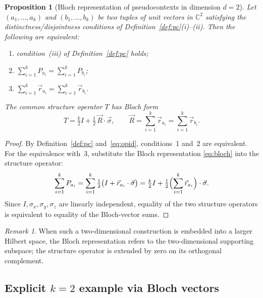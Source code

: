 \documentclass[
  twocolumn,
  aps,
  pra,
  floatfix,
  amsmath,amssymb,
  longbibliography
]{revtex4-2}
\newtheorem{proposition}[theorem]{Proposition}
\theoremstyle{definition}
\theoremstyle{remark}
\newtheorem{remark}[theorem]{Remark}
\begin{document}
\begin{proposition}[Bloch representation of pseudocontexts in dimension $d=2$]
\label{prop:bloch_pc}
Let $(a_1,\ldots,a_k)$ and $(b_1,\ldots,b_k)$ be two tuples of unit vectors in
$\mathbb{C}^2$ satisfying the distinctness/disjointness conditions of
Definition~\ref{def:pc}(i)--(ii). Then the following are equivalent:
\begin{enumerate}
    \item condition~(iii) of Definition~\ref{def:pc} holds;
    \item $\displaystyle\sum_{i=1}^{k}P_{a_i}
            = \sum_{i=1}^{k}P_{b_i}$;
    \item $\displaystyle\sum_{i=1}^{k}\vec{r}_{a_i}
            = \sum_{i=1}^{k}\vec{r}_{b_i}$.
\end{enumerate}
The common structure operator $T$ has Bloch form
\[
  T=\tfrac{k}{2}I+\tfrac{1}{2}\,\vec{R}\cdot\vec{\sigma},
  \qquad \vec{R}=\sum_{i=1}^{k}\vec{r}_{a_i}
              =\sum_{i=1}^{k}\vec{r}_{b_i}.
\]
\end{proposition}

\begin{proof}
By Definition~\ref{def:pc} and~\eqref{eq:opid}, conditions~1 and~2 are
equivalent. For the equivalence with~3, substitute the Bloch representation
\eqref{eq:bloch} into the structure operator:
\[
  \sum_{i=1}^{k}P_{a_i}
  =\sum_{i=1}^{k}\tfrac{1}{2}\bigl(I+\vec{r}_{a_i}\cdot\vec{\sigma}\bigr)
  =\tfrac{k}{2}I+\tfrac{1}{2}\Bigl(\sum_{i=1}^{k}\vec{r}_{a_i}\Bigr)
   \cdot\vec{\sigma}.
\]
Since $I,\sigma_x,\sigma_y,\sigma_z$ are linearly independent, equality of
the two structure operators is equivalent to equality of the Bloch-vector sums.
\end{proof}

\begin{remark}
When such a two-dimensional construction is embedded into a larger Hilbert space, the Bloch representation refers to the two-dimensional supporting subspace; the structure operator is extended by zero on its orthogonal complement.
\end{remark}

\subsection{Explicit \texorpdfstring{$k=2$}{k=2} example via Bloch vectors}
\label{sec:d2_example}
\end{document}
